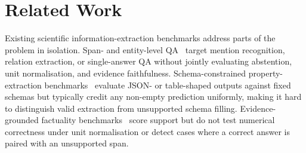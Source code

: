 \documentclass{article}
\newcommand{\NR}{\texttt{NOT\_REPORTED}}
\begin{document}

\section{Related Work}
\label{sec:related}

Existing scientific information-extraction benchmarks address parts of the problem in isolation. Span- and entity-level QA~\citep{jain2020scirex,li2016bc5cdr,islamaj2021nlmchem,jin2019pubmedqa} target mention recognition, relation extraction, or single-answer QA without jointly evaluating abstention, unit normalisation, and evidence faithfulness. Schema-constrained property-extraction benchmarks~\citep{dunn2022matscholar,song2023matscinlp,zaki2023mascqa,polak2023extracting} evaluate JSON- or table-shaped outputs against fixed schemas but typically credit any non-empty prediction uniformly, making it hard to distinguish valid extraction from unsupported schema filling. Evidence-grounded factuality benchmarks~\citep{wadden2020scifact,lu2023scitab,ru2024ragchecker} score support but do not test numerical correctness under unit normalisation or detect cases where a correct answer is paired with an unsupported span.
\end{document}
